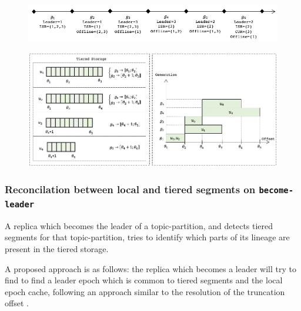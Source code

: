 \documentclass{article}
\begin{document}
\begin{figure}[h!]
	\centering
	\includegraphics[scale=0.6]{seq-generations.png}
	\label{fig:seq-generations}
\end{figure}

\begin{figure}[h!]
	\centering
	\includegraphics[scale=0.6]{tiered-storage.png}
	\label{fig:tiered-storage}
\end{figure}

\subsubsection{Reconcilation between local and tiered segments on \texttt{become-leader}}

A replica which becomes the leader of a topic-partition, and detects tiered segments for that topic-partition, tries to identify which parts of its lineage are present in the tiered storage. 

A proposed approach is as follows: the replica which becomes a leader will try to find to find a leader epoch which is common to tiered segments and the local epoch cache, following an approach similar to the resolution of the truncation offset \cite{KIP279}.
\end{document}
